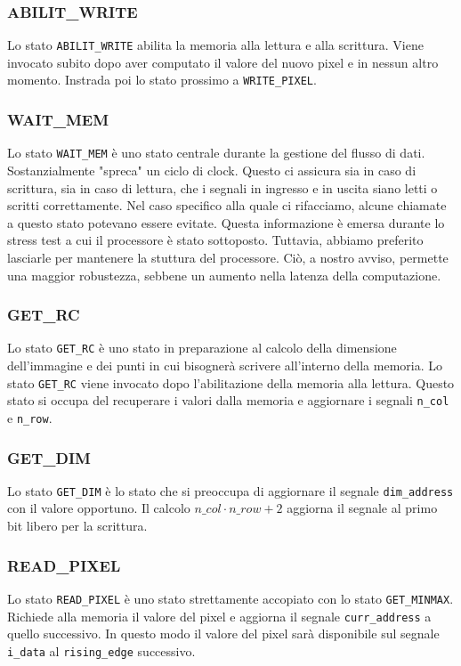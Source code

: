 \documentclass[11pt, a4paper]{article}
\begin{document}
\subsubsection{ABILIT\_WRITE}
Lo stato \texttt{ABILIT\_WRITE} abilita la memoria alla lettura e alla scrittura. Viene invocato subito dopo aver computato il valore del nuovo pixel e in nessun altro momento. Instrada poi lo stato prossimo a \texttt{WRITE\_PIXEL}.

\subsubsection{WAIT\_MEM}
Lo stato \texttt{WAIT\_MEM} è uno stato centrale durante la gestione del flusso di dati. Sostanzialmente "spreca" un ciclo di clock. Questo ci assicura sia in caso di scrittura, sia in caso di lettura, che i segnali in ingresso e in uscita siano letti o scritti correttamente. Nel caso specifico alla quale ci rifacciamo, alcune chiamate a questo stato potevano essere evitate. Questa informazione è emersa durante lo stress test a cui il processore è stato sottoposto. Tuttavia, abbiamo preferito lasciarle per mantenere la stuttura del processore. Ciò, a nostro avviso, permette una maggior robustezza, sebbene un aumento nella latenza della computazione.

\subsubsection{GET\_RC}
Lo stato \texttt{GET\_RC} è uno stato in preparazione al calcolo della dimensione dell'immagine e dei punti in cui bisognerà scrivere all'interno della memoria. Lo stato \texttt{GET\_RC} viene invocato dopo l'abilitazione della memoria alla lettura. Questo stato si occupa del recuperare i valori dalla memoria e aggiornare i segnali \texttt{n\_col} e \texttt{n\_row}.

\subsubsection{GET\_DIM}
Lo stato \texttt{GET\_DIM} è lo stato che si preoccupa di aggiornare il segnale \texttt{dim\_address} con il valore opportuno. Il calcolo $n\_col \cdot n\_row + 2$ aggiorna il segnale al primo bit libero per la scrittura.

\subsubsection{READ\_PIXEL}
Lo stato \texttt{READ\_PIXEL} è uno stato strettamente accopiato con lo stato \texttt{GET\_MINMAX}. Richiede alla memoria il valore del pixel e aggiorna il segnale \texttt{curr\_address} a quello successivo. In questo modo il valore del pixel sarà disponibile sul segnale \texttt{i\_data} al \texttt{rising\_edge} successivo.
\end{document}
